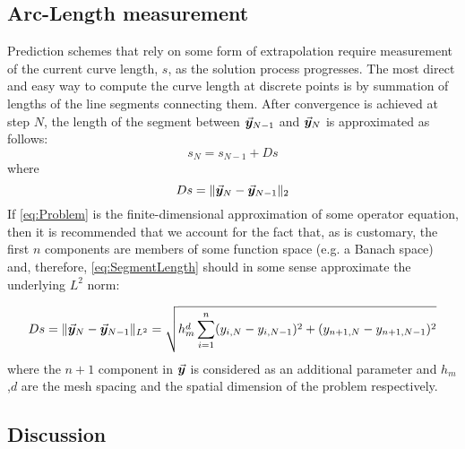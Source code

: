 \subsection{Arc-Length measurement}
Prediction schemes that rely on some form of extrapolation require measurement 
of the current curve length, $s$, as the solution 
process progresses. The most direct and easy way
to compute the curve length at discrete points is by summation of lengths  
of the line segments connecting them. After convergence is achieved at step $N$,
the length of the segment between $\vec{\bm{y}}_{N-1}$ and $\vec{\bm{y}}_N$ is 
approximated as follows:
\begin{equation}
	s_N=s_{N-1}+Ds
	\label{eq:newS}
\end{equation}
where
\begin{equation}
	Ds = \Vert \vec{\bm{y}}_N-\vec{\bm{y}}_{N-1}\Vert_2
	\label{eq:SegmentLength}
\end{equation}
If \ref{eq:Problem} is the finite-dimensional approximation of some operator
equation, then it is recommended\cite{Keller87} that we account for the fact
that, as is customary, the first $n$ components are members of some function
space (e.g. a Banach space) and, therefore, \ref{eq:SegmentLength} should in 
some sense approximate the underlying $L^2$ norm:

\begin{equation}
	Ds = \Vert 
	\vec{\bm{y}}_N-\vec{\bm{y}}_{N-1}\Vert_{L^2}=\sqrt{h_m^d\sum_{i=1}^n(y_{i,N}-y_{i,N-1})^2+(y_{n+1,N}-y_{n+1,N-1})^2}
	\label{eq:INCR}
\end{equation}
where the $n+1$ component in $\vec{\bm{y}}$ is considered as an additional 
parameter and
$h_m$,$d$ are the mesh spacing and the spatial dimension of the problem 
respectively.


\subsection{Discussion}\label{CH5-S3SS2}

